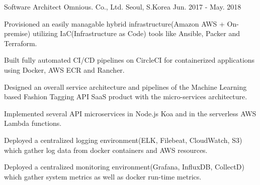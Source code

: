 \cventry
{Software Architect} %
{Omnious. Co., Ltd.} %
{Seoul, S.Korea} %
{Jun. 2017 - May. 2018} %
{
\begin{cvitems} %
    \item {Provisioned an easily managable hybrid infrastructure(Amazon AWS + On-premise) utilizing IaC(Infrastructure as Code) tools like Ansible, Packer and Terraform.}
    \item {Built fully automated CI/CD pipelines on CircleCI for containerized applications using Docker, AWS ECR and Rancher.}
    \item {Designed an overall service architecture and pipelines of the Machine Learning based Fashion Tagging API SaaS product with the micro-services architecture.}
    \item {Implemented several API microservices in Node.js Koa and in the serverless AWS Lambda functions.}
    \item {Deployed a centralized logging environment(ELK, Filebeat, CloudWatch, S3) which gather log data from docker containers and AWS resources.}
    \item {Deployed a centralized monitoring environment(Grafana, InfluxDB, CollectD) which gather system metrics as well as docker run-time metrics.}
\end{cvitems}
}